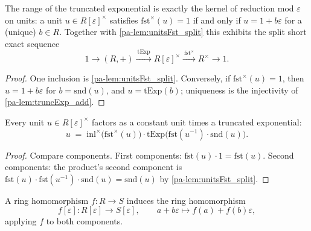 \begin{theorem}
  \label{pa-thm:truncExp_exact}
  \leanok

  The range of the truncated exponential is exactly the kernel of reduction mod
  \(\varepsilon\) on units: a unit \(u \in R[\varepsilon]^\times\) satisfies
  \(\mathrm{fst}^\times(u) = 1\) if and only if \(u = 1 + b\varepsilon\) for a (unique)
  \(b \in R\). Together with \ref{pa-lem:unitsFst_split} this exhibits the split short
  exact sequence
  \[
    1 \longrightarrow (R, +) \xrightarrow{\ \mathrm{tExp}\ } R[\varepsilon]^\times
      \xrightarrow{\ \mathrm{fst}^\times\ } R^\times \longrightarrow 1 .
  \]
\end{theorem}
\begin{proof}
  \leanok
  One inclusion is \ref{pa-lem:unitsFst_split}. Conversely, if
  \(\mathrm{fst}^\times(u) = 1\), then \(u = 1 + b\varepsilon\) for
  \(b = \mathrm{snd}(u)\), and \(u = \mathrm{tExp}(b)\); uniqueness is the injectivity
  of \ref{pa-lem:truncExp_add}.
\end{proof}

\begin{lemma}
  \label{pa-lem:unit_decomposition}
  \leanok

  Every unit \(u \in R[\varepsilon]^\times\) factors as a constant unit times a
  truncated exponential:
  \[
    u \;=\; \mathrm{inl}^\times\bigl(\mathrm{fst}^\times(u)\bigr)
      \cdot \mathrm{tExp}\bigl(\mathrm{fst}(u^{-1}) \cdot \mathrm{snd}(u)\bigr).
  \]
\end{lemma}
\begin{proof}
  \leanok
  Compare components. First components: \(\mathrm{fst}(u) \cdot 1 = \mathrm{fst}(u)\).
  Second components: the product's second component is
  \(\mathrm{fst}(u) \cdot \mathrm{fst}(u^{-1}) \cdot \mathrm{snd}(u) =
  \mathrm{snd}(u)\) by \ref{pa-lem:unitsFst_split}.
\end{proof}

\begin{definition}
  \label{pa-def:dualNumber_map}
  \leanok

  A ring homomorphism \(f : R \to S\) induces the ring homomorphism
  \[
    f[\varepsilon] : R[\varepsilon] \to S[\varepsilon], \qquad
    a + b\varepsilon \longmapsto f(a) + f(b)\varepsilon,
  \]
  applying \(f\) to both components.
\end{definition}

